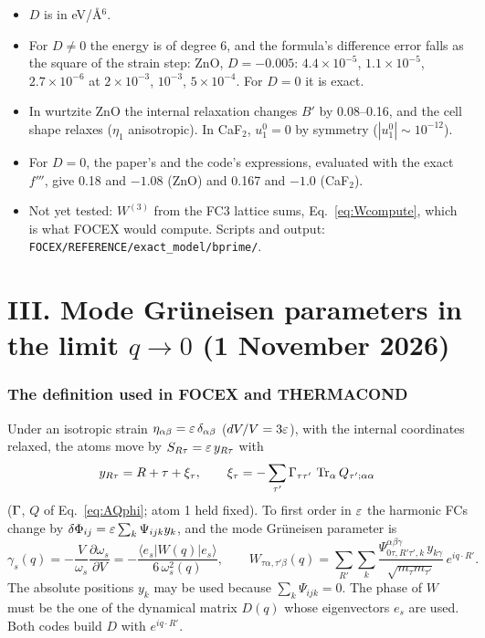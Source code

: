 \documentclass[11pt,a4paper]{article}
\newcommand{\al}{\alpha}\newcommand{\be}{\beta}\newcommand{\ga}{\gamma}\newcommand{\de}{\delta}
\newcommand{\Tr}{\operatorname{Tr}}
\newcommand{\Wt}{W^{(3)}}\newcommand{\Wf}{W^{(4)}}
\begin{document}
\begin{itemize}
\item $D$ is in eV/\AA$^6$.
\item For $D\neq0$ the energy is of degree 6, and the formula's difference error falls as the square of the
  strain step: ZnO, $D=-0.005$: $4.4\times10^{-5}$, $1.1\times10^{-5}$, $2.7\times10^{-6}$ at $2\times10^{-3}$,
  $10^{-3}$, $5\times10^{-4}$. For $D=0$ it is exact.
\item In wurtzite ZnO the internal relaxation changes $B'$ by 0.08--0.16, and the cell shape relaxes ($\eta_1$
  anisotropic). In CaF$_2$, $u^0_1=0$ by symmetry ($|u^0_1|\sim10^{-12}$).
\item For $D=0$, the paper's and the code's expressions, evaluated with the exact $f'''$, give 0.18 and $-1.08$
  (ZnO) and 0.167 and $-1.0$ (CaF$_2$).
\item Not yet tested: $\Wt$ from the FC3 lattice sums, Eq.~\eqref{eq:Wcompute}, which is what FOCEX would
  compute. Scripts and output: \texttt{FOCEX/REFERENCE/exact\_model/bprime/}.
\end{itemize}

\part*{III. Mode Gr\"uneisen parameters in the limit \texorpdfstring{$q\to0$}{q -> 0} (1 November 2026)}

\section{The definition used in FOCEX and THERMACOND}
Under an isotropic strain $\eta_{\al\be}=\ep\,\de_{\al\be}$ ($dV/V=3\varepsilon$), with the internal coordinates
relaxed, the atoms move by $S_{R\tau}=\varepsilon\,y_{R\tau}$ with
\begin{equation}
y_{R\tau}=R+\tau+\xi_\tau,\qquad \xi_\tau=-\sum_{\tau'}\Ga_{\tau\tau'}\,\Tr_{\al}Q_{\tau';\al\al}
\label{eq:yrelax}
\end{equation}
($\Gamma$, $Q$ of Eq.~\eqref{eq:AQphi}; atom 1 held fixed). To first order in $\varepsilon$ the harmonic FCs change by
$\delta\Phi_{ij}=\varepsilon\sum_k\Psi_{ijk}y_k$, and the mode Gr\"uneisen parameter is
\begin{equation}
\ga_s(q)=-\frac{V}{\omega_s}\frac{\partial\omega_s}{\partial V}=-\frac{\langle e_s|W(q)|e_s\rangle}{6\,\omega_s^2(q)},
\qquad
W_{\tau\al,\tau'\be}(q)=\sum_{R'}\sum_{k}\frac{\Psi^{\al\be\ga}_{0\tau,R'\tau',k}\,y_{k\ga}}{\sqrt{m_\tau m_{\tau'}}}\,e^{iq\cdot R'} .
\label{eq:gamma}
\end{equation}
The absolute positions $y_k$ may be used because $\sum_k\Psi_{ijk}=0$. The phase of $W$ must be the one of
the dynamical matrix $D(q)$ whose eigenvectors $e_s$ are used. Both codes build $D$ with $e^{iq\cdot R'}$.
\end{document}
